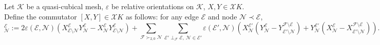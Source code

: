 \begin{definition}
  Let $\mathcal{K}$ be a quasi-cubical mesh,
    $\varepsilon$ be relative orientations on $\mathcal{K}$,
    $X, Y \in \mathcal{X} K$.
  Define the commutator $[X, Y] \in \mathcal{X} K$ as follows:
  for any edge $\mathcal{E}$ and node $\mathcal{N} \prec \mathcal{E}$,
  \begin{equation}
    [X, Y]^{\mathcal{E}}_{\mathcal{N}}
    := 2 \varepsilon(\mathcal{E}, \mathcal{N})
      (   X^{\mathcal{E}}_{\mathcal{E} \setminus \mathcal{N}}
          Y^{\mathcal{E}}_{\mathcal{N}}
        - X^{\mathcal{E}}_{\mathcal{N}}
          Y^{\mathcal{E}}_{\mathcal{E} \setminus \mathcal{N}}
      )
      + \sum_{\mathcal{F} \succ_{2, 0} \mathcal{N}}
        \sum_{\mathcal{E}' \perp_{\mathcal{F}} \mathcal{E},\
              \mathcal{N} \in \mathcal{E}'}
        \varepsilon(\mathcal{E}', \mathcal{N})
        ( X^{\mathcal{E}'}_{\mathcal{N}}
          (Y^{\mathcal{E}}_{\mathcal{N}}
           - Y^{\mathcal{F} \setminus \mathcal{E}}
            _{\mathcal{E}' \setminus \mathcal{N}})
          +
          Y^{\mathcal{E}'}_{\mathcal{N}}
          (X^{\mathcal{E}}_{\mathcal{N}}
           - X^{\mathcal{F} \setminus \mathcal{E}}
            _{\mathcal{E}' \setminus \mathcal{N}})
        ).
  \end{equation}
\end{definition}
